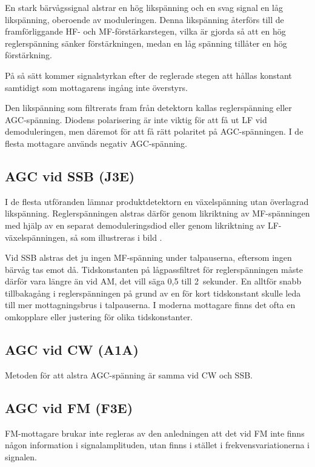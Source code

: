 En stark bärvågssignal alstrar en hög likspänning och en svag signal
en låg likspänning, oberoende av moduleringen.
Denna likspänning återförs till de framförliggande HF- och MF-förstärkarstegen,
vilka är gjorda så att en hög reglerspänning sänker förstärkningen, medan en
låg spänning tillåter en hög förstärkning.

På så sätt kommer signalstyrkan efter de reglerade stegen att hållas
konstant samtidigt som mottagarens ingång inte överstyrs.

Den likspänning som filtrerats fram från detektorn kallas reglerspänning eller
AGC-spänning.
Diodens polarisering är inte viktig för att få ut LF vid demoduleringen, men
däremot för att få rätt polaritet på AGC-spänningen.
I de flesta mottagare används negativ AGC-spänning.

\subsection{AGC vid SSB (J3E)}

I de flesta utföranden lämnar produktdetektorn en växelspänning utan
överlagrad likspänning.
Reglerspänningen alstras därför genom likriktning av MF-spänningen med hjälp
av en separat demoduleringsdiod eller genom likriktning av LF-växelspänningen,
så som illustreras i bild .

Vid SSB alstras det ju ingen MF-spänning under talpauserna, eftersom
ingen bärvåg tas emot då.
Tidskonstanten på lågpassfiltret för reglerspänningen måste därför vara längre
än vid AM, det vill säga 0,5 till 2~sekunder.
En alltför snabb tillbakagång i reglerspänningen på grund av en för kort
tidskonstant skulle leda till mer mottagningsbrus i talpauserna.
I moderna mottagare finns det ofta en omkopplare eller justering för olika
tidskonstanter.

\subsection{AGC vid CW (A1A)}

Metoden för att alstra AGC-spänning är samma vid CW och SSB.

\subsection{AGC vid FM (F3E)}

FM-mottagare brukar inte regleras av den anledningen att det vid FM
inte finns någon information i signalamplituden, utan finns i stället
i frekvensvariationerna i signalen.

